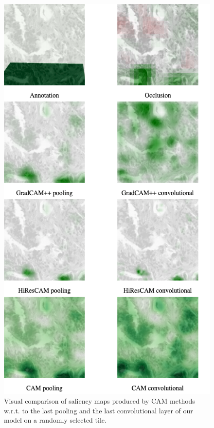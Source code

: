 \begin{figure}
    \begin{center}
    \begin{minipage}{0.5\textwidth}
      \includegraphics[width=\textwidth]{img/conv-vs-pool.png}
    \end{minipage}
    \caption{
    Visual comparison of saliency maps produced by CAM methods w.r.t. to the last pooling and the last convolutional layer of our model on a randomly selected tile.
}
\end{center}
\end{figure}
